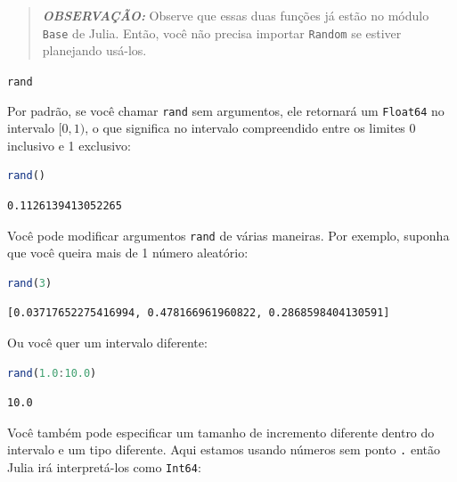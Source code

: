 \documentclass[
  notoc %
]{tufte-book}
\makeatletter
\newcommand{\passthrough}[1]{#1}
\renewcommand\subsubsection{%
\@startsection{subsubsection}{3}{\z@ }{-3.25ex\@plus -1ex \@minus -.2ex}{1.5ex \@plus .2ex}{\normalfont \normalsize \bfseries }
}
\makeatother
\begin{document}
\begin{quote}
\textbf{\emph{OBSERVAÇÃO:}} Observe que essas duas funções já estão no
módulo \passthrough{\lstinline!Base!} de Julia. Então, você não precisa
importar \passthrough{\lstinline!Random!} se estiver planejando usá-los.
\end{quote}

\hypertarget{sec:random_rand}{%
\subsubsection{\texorpdfstring{\texttt{rand}}{rand}}\label{sec:random_rand}}

Por padrão, se você chamar \passthrough{\lstinline!rand!} sem
argumentos, ele retornará um \passthrough{\lstinline!Float64!} no
intervalo \([0, 1)\), o que significa no intervalo compreendido entre os
limites 0 inclusivo e 1 exclusivo:

\begin{lstlisting}[language=Julia]
rand()
\end{lstlisting}

\begin{lstlisting}[language=Output]
0.1126139413052265
\end{lstlisting}

Você pode modificar argumentos \passthrough{\lstinline!rand!} de várias
maneiras. Por exemplo, suponha que você queira mais de 1 número
aleatório:

\begin{lstlisting}[language=Julia]
rand(3)
\end{lstlisting}

\begin{lstlisting}[language=Output]
[0.03717652275416994, 0.478166961960822, 0.2868598404130591]
\end{lstlisting}

Ou você quer um intervalo diferente:

\begin{lstlisting}[language=Julia]
rand(1.0:10.0)
\end{lstlisting}

\begin{lstlisting}[language=Output]
10.0
\end{lstlisting}

Você também pode especificar um tamanho de incremento diferente dentro
do intervalo e um tipo diferente. Aqui estamos usando números sem ponto
\passthrough{\lstinline!.!} então Julia irá interpretá-los como
\passthrough{\lstinline!Int64!}:
\end{document}
